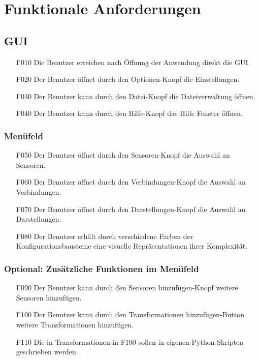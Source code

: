 \documentclass[parskip=full]{scrartcl}
\begin{document}
\section{Funktionale Anforderungen}\label{funktionale}


\subsection{GUI}

\begin{itemize}
\item[F010] Die Benutzer erreichen nach Öffnung der Anwendung direkt die GUI.
\item[F020] Der Benutzer öffnet durch den Optionen-Knopf die Einstellungen.
\item[F030] Der Benutzer kann durch den Datei-Knopf die Dateiverwaltung öffnen.
\item[F040] Der Benutzer kann durch den Hilfe-Knopf das Hilfe Fenster öffnen.
\end{itemize}

\subsubsection{Menüfeld}

\begin{itemize}
\item[F050] Der Benutzer öffnet durch den Sensoren-Knopf die Auswahl an Sensoren.
\item[F060] Der Benutzer öffnet durch den Verbindungen-Knopf die Auswahl an Verbindungen.
\item[F070] Der Benutzer öffnet durch den Darstellungen-Knopf die Auswahl an Darstellungen.
\item[F080] Der Benutzer erhält durch verschiedene Farben der Konfigurationsbausteine eine visuelle Repräsentationen ihrer Komplexität.
\end{itemize}

\subsubsection{Optional: Zusätzliche Funktionen im Menüfeld}

\begin{itemize}

\item[F090] Der Benutzer kann durch den Sensoren hinzufügen-Knopf weitere Sensoren hinzufügen.
\item[F100] Der Benutzer kann durch den Transformationen hinzufügen-Button weitere Transformationen hinzufügen.
\item[F110] Die in Transformationen in F100 sollen in eigenen Python-Skripten geschrieben werden.
\end{itemize}
\end{document}

